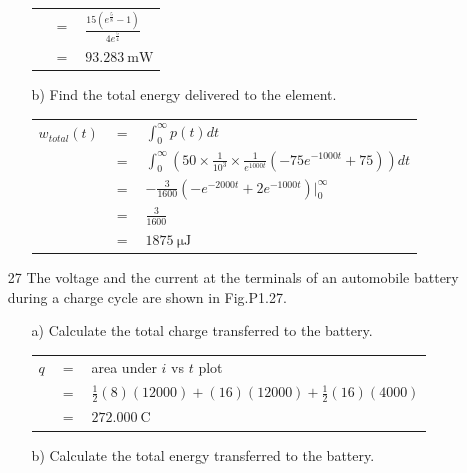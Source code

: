 \documentclass[a4paper]{article}
\begin{document}
\begin{itemize}
\begin{itemize}
\begin{tabular}{r c l}
		      	                      & $=$ & $\frac{15(e^{\frac{5}{8}} - 1)}{4e^{\frac{5}{4}}}$                                                      \\
		      	                      & $=$ & $\SI{93.283}{\milli\watt}$                                                                              \\
		      \end{tabular}
		\item[b)] Find the total energy delivered to the element. \\
		      \begin{tabular}{r c l}
		      	$w_{total}(t)$ & $=$ & $\int_{0}^{\infty} p(t)dt$                                                                  \\
		      	               & $=$ & $\int_{0}^{\infty} (50\times\frac{1}{10^3}\times\frac{1}{e^{1000t}}(-75e^{-1000t} + 75))dt$ \\
		      	               & $=$ & $-\frac{3}{1600}(-e^{-2000t} + 2e^{-1000t})|_{0}^{\infty}$                                  \\
		      	               & $=$ & $\frac{3}{1600}$                                                                            \\
		      	               & $=$ & $\SI{1875}{\micro\joule}$                                                                   \\
		      \end{tabular} 
	\end{itemize}
	\item[27] The voltage and the current at the terminals of an automobile battery during a charge cycle are shown in Fig.P1.27.
	      \begin{itemize}
	      	\item[a)] Calculate the total charge transferred to the battery. \\
	      	      \begin{tabular}{r c l}
	      	      	$q$ & $=$ & area under $i$ vs $t$ plot                                    \\
	      	      	    & $=$ & $\frac{1}{2}(8)(12000) + (16)(12000) + \frac{1}{2}(16)(4000)$ \\
	      	      	    & $=$ & $\SI{272,000}{\coulomb}$                                      \\
	      	      \end{tabular}
	      	\item[b)] Calculate the total energy transferred to the battery. \\

\end{itemize}
\end{itemize}
\end{document}

